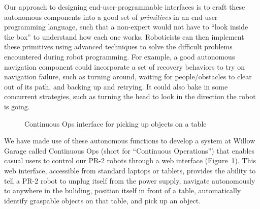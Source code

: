 \documentclass[10pt,twocolumn]{article}
\begin{document}
Our approach to designing end-user-programmable interfaces is to craft these autonomous components into a good set of {\em primitives} in an end user programming language, such that a non-expert would not have to ``look inside the box'' to understand how each one works. Roboticists can then implement these primitives using advanced techniques to solve the difficult problems encountered during robot programming. For example, a good autonomous navigation component could incorporate a set of recovery behaviors to try on navigation failure, such as turning around, waiting for people/obstacles to clear out of its path, and backing up and retrying. It could also bake in some concurrent strategies, such as turning the head to look in the direction the robot is going. 


\begin{figure}[tbh]
\center{}
\caption{Continuous Ops interface for picking up objects on a table}
\label{contops}
\end{figure}

We have made use of these autonomous functions to develop a system at Willow Garage called Continuous Ops (short for ``Continuous Operations'') that enables casual users to control our PR-2 robots through a web interface (Figure~\ref{contops}). This web interface, accessible from standard laptops or tablets, provides the ability to tell a PR-2 robot to unplug itself from the power supply, navigate autonomously to anywhere in the buliding, position itself in front of a table, automatically identify graspable objects on that table, and pick up an object.
\end{document}

